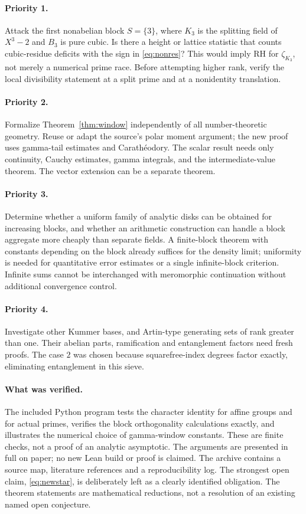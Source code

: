 \documentclass[11pt,letterpaper]{article}
\theoremstyle{definition}\newtheorem{definition}[theorem]{Definition}
\theoremstyle{remark}\newtheorem{remark}[theorem]{Remark}
\begin{document}
\paragraph{Priority 1.} Attack the first nonabelian block $S=\{3\}$, where $K_3$ is the splitting field of $X^3-2$ and $B_3$ is pure cubic. Is there a height or lattice statistic that counts cubic-residue deficits with the sign in \eqref{eq:nonres}? This would imply RH for $\zeta_{K_3}$, not merely a numerical prime race. Before attempting higher rank, verify the local divisibility statement at a split prime and at a nonidentity translation.

\paragraph{Priority 2.} Formalize Theorem~\ref{thm:window} independently of all number-theoretic geometry. Reuse or adapt the source's polar moment argument; the new proof uses gamma-tail estimates and Carath\'eodory. The scalar result needs only continuity, Cauchy estimates, gamma integrals, and the intermediate-value theorem. The vector extension can be a separate theorem.

\paragraph{Priority 3.} Determine whether a uniform family of analytic disks can be obtained for increasing blocks, and whether an arithmetic construction can handle a block aggregate more cheaply than separate fields. A finite-block theorem with constants depending on the block already suffices for the density limit; uniformity is needed for quantitative error estimates or a single infinite-block criterion. Infinite sums cannot be interchanged with meromorphic continuation without additional convergence control.

\paragraph{Priority 4.} Investigate other Kummer bases, and Artin-type generating sets of rank greater than one. Their abelian parts, ramification and entanglement factors need fresh proofs. The case $2$ was chosen because squarefree-index degrees factor exactly, eliminating entanglement in this sieve.

\paragraph{What was verified.} The included Python program tests the character identity for affine groups and for actual primes, verifies the block orthogonality calculations exactly, and illustrates the numerical choice of gamma-window constants. These are finite checks, not a proof of an analytic asymptotic. The arguments are presented in full on paper; no new Lean build or proof is claimed. The archive contains a source map, literature references and a reproducibility log. The strongest open claim, \eqref{eq:newstar}, is deliberately left as a clearly identified obligation. The theorem statements are mathematical reductions, not a resolution of an existing named open conjecture.
\end{document}
